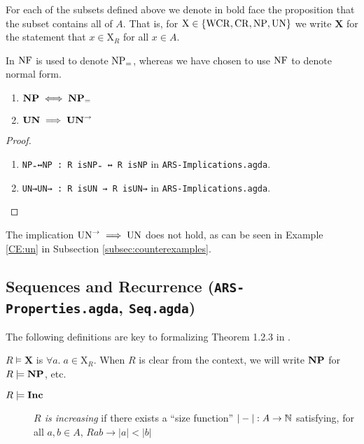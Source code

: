 For each of the subsets defined above we denote in bold face the proposition that the subset contains all of $A$.
That is, for $\mathrm{X} \in \{\mathrm{WCR} , \mathrm{CR} , \mathrm{NP} , \mathrm{UN} \}$ we write $\mathbf{X}$ for the statement that $x \in \mathrm{X}_R$ for all $x \in A$.


In \terese $\mathrm{NF}$ is used to denote $\mathrm{NP_=}$, whereas we have chosen to use $\mathrm{NF}$ to denote normal form.

\begin{proposition}\hfill
    \begin{enumerate}
        \item $\mathbf{NP} \iff \mathbf{NP_=}$
        \item $\mathbf{UN} \implies \mathbf{UN}^{\to}$
    \end{enumerate}
\end{proposition}
\begin{proof} \hfill
    \begin{enumerate}
        \item \verb|NP₌↔NP : R isNP₌ ↔ R isNP| in \texttt{ARS-Implications.agda}.
        \item \verb|UN→UN→ : R isUN → R isUN→| in \texttt{ARS-Implications.agda}.
    \end{enumerate}
\end{proof}

The implication $\mathrm{UN}^{\to} \implies \mathrm{UN}$ does not hold, as can be seen in Example \ref{CE:un} in Subsection \ref{subsec:counterexamples}.

\subsection{Sequences and Recurrence (\texttt{ARS-Properties.agda}, \texttt{Seq.agda})}
The following definitions are key to formalizing Theorem 1.2.3 in \terese.

\begin{notation}
    $R \models \mathbf{X}$ is $\forall a.\; a \in \mathrm{X}_R$. When $R$ is clear from the context, we will write $\mathbf{NP}$ for $R \models \mathbf{NP}$, etc.
\end{notation}

\begin{definition} \hfill
    \begin{description}
        \item[$R \models \mathbf{Inc}$] \emph{$R$ is increasing} if there exists a ``size function'' $|-| : A \to \mathbb{N}$ satisfying, for all $a, b \in A$,
        $Rab \to |a| < |b|$
    \end{description}
\end{definition}

